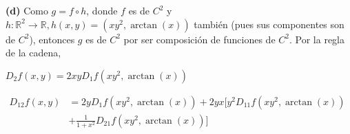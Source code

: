 \documentclass[12pt]{report}
\newcommand{\R}{\mathbb R}
\begin{document}
\vspace{2mm}
\textbf{(d) } Como $g = f \circ h$, donde $f$ es de $C^2$ y $h \colon \R^2 \to \R, h(x,y) = (xy^2,\arctan(x))$ también (pues sus componentes son de $C^2$), entonces $g$ es de $C^2$ por ser composición de funciones de $C^2$. Por la regla de la cadena,

\vspace{2mm}
$\displaystyle D_2f(x,y) = 2xyD_1f(xy^2,\arctan(x))$

\vspace{2mm}
$\begin{aligned} \displaystyle D_{12}f(x,y) &= 2yD_1f(xy^2,\arctan(x)) + 2yx \bigl[y^2D_{11}f(xy^2,\arctan(x)) \\ &+ \frac{1}{1+x^2}D_{21}f(xy^2,\arctan(x))\bigr] \end{aligned}$
\end{document}
